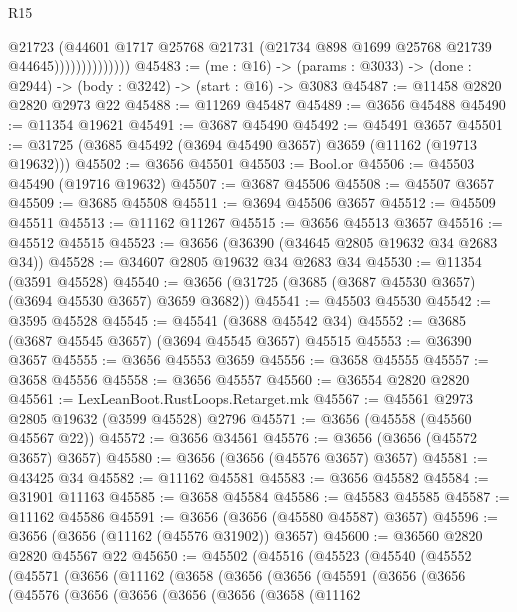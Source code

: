 \begin{lexlean}{R15}
\begin{coremodule}
                            @21723
                            (@44601
                              @1717
                              @25768
                              @21731
                              (@21734 @898 @1699 @25768 @21739 @44645))))))))))))))
@45483 := (me : @16) ->
  (params : @3033) -> (done : @2944) -> (body : @3242) -> (start : @16) -> @3083
@45487 := @11458 @2820 @2820 @2973 @22
@45488 := @11269 @45487
@45489 := @3656 @45488
@45490 := @11354 @19621
@45491 := @3687 @45490
@45492 := @45491 @3657
@45501 := @31725 (@3685 @45492 (@3694 @45490 @3657) @3659 (@11162 (@19713 @19632)))
@45502 := @3656 @45501
@45503 := Bool.or
@45506 := @45503 @45490 (@19716 @19632)
@45507 := @3687 @45506
@45508 := @45507 @3657
@45509 := @3685 @45508
@45511 := @3694 @45506 @3657
@45512 := @45509 @45511
@45513 := @11162 @11267
@45515 := @3656 @45513 @3657
@45516 := @45512 @45515
@45523 := @3656 (@36390 (@34645 @2805 @19632 @34 @2683 @34))
@45528 := @34607 @2805 @19632 @34 @2683 @34
@45530 := @11354 (@3591 @45528)
@45540 := @3656 (@31725 (@3685 (@3687 @45530 @3657) (@3694 @45530 @3657) @3659 @3682))
@45541 := @45503 @45530
@45542 := @3595 @45528
@45545 := @45541 (@3688 @45542 @34)
@45552 := @3685 (@3687 @45545 @3657) (@3694 @45545 @3657) @45515
@45553 := @36390 @3657
@45555 := @3656 @45553 @3659
@45556 := @3658 @45555
@45557 := @3658 @45556
@45558 := @3656 @45557
@45560 := @36554 @2820 @2820
@45561 := LexLeanBoot.RustLoops.Retarget.mk
@45567 := @45561 @2973 @2805 @19632 (@3599 @45528) @2796
@45571 := @3656 (@45558 (@45560 @45567 @22))
@45572 := @3656 @34561
@45576 := @3656 (@3656 (@45572 @3657) @3657)
@45580 := @3656 (@3656 (@45576 @3657) @3657)
@45581 := @43425 @34
@45582 := @11162 @45581
@45583 := @3656 @45582
@45584 := @31901 @11163
@45585 := @3658 @45584
@45586 := @45583 @45585
@45587 := @11162 @45586
@45591 := @3656 (@3656 (@45580 @45587) @3657)
@45596 := @3656 (@3656 (@11162 (@45576 @31902)) @3657)
@45600 := @36560 @2820 @2820 @45567 @22
@45650 := @45502
    (@45516
      (@45523
        (@45540
          (@45552
            (@45571
              (@3656
                (@11162
                  (@3658
                    (@3656
                      (@3656
                        (@45591
                          (@3656
                            (@3656
                              (@45576
                                (@3656
                                  (@3656
                                    (@3656
                                      (@3656
                                        (@3658
                                          (@11162

\end{coremodule}
\end{lexlean}
